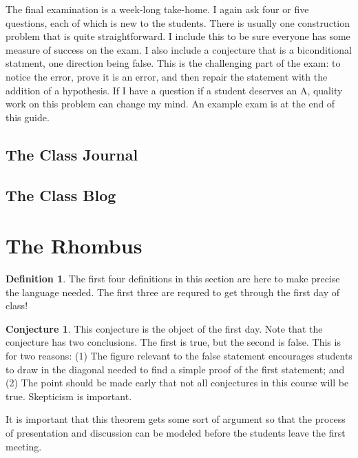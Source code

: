 \documentclass{tufte-handout}
\theoremstyle{definition}
\newtheorem{conjecture}[problem]{Conjecture}
\newtheorem*{definition}{Definition}
\begin{document}
The final examination is a week-long take-home.
I again ask four or five questions, each of which is new to the students.
There is usually one construction problem that is quite straightforward.
I include this to be sure everyone has some measure of success on the exam.
I also include a conjecture that is a biconditional statment, one direction being false.
This is the challenging part of the exam: to notice the error, prove it is an error, and then repair the statement with the addition of a hypothesis.
If I have a question if a student deserves an A, quality work on this problem can change my mind.
An example exam is at the end of this guide.

\subsection{The Class Journal}


\subsection{The Class Blog}





\clearpage
\setcounter{section}{1}
\section{The Rhombus}

\begin{definition}
The first four definitions in this section are here to make precise the language needed. The first three are requred to get through the first day of class! 
\end{definition}

\begin{conjecture}
This conjecture is the object of the first day.
Note that the conjecture has two conclusions.
The first is true, but the second is false.
This is for two reasons:
(1) The figure relevant to the false statement encourages students to draw in the diagonal needed to find a simple proof of the first statement; and
(2) The point should be made early that not all conjectures in this course will be true.
Skepticism is important.

It is important that this theorem gets some sort of argument so that the process of presentation and discussion can be modeled before the students leave the first meeting.\\
\end{conjecture}
\end{document}
